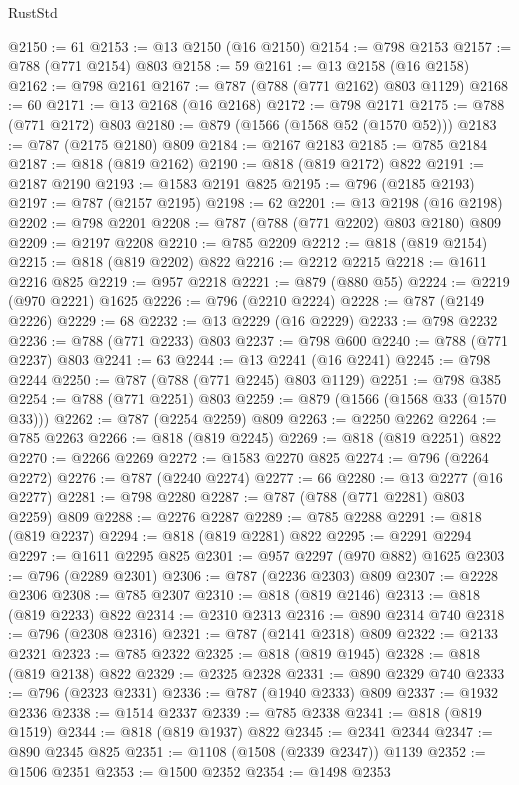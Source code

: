 \begin{lexlean}{RustStd}
\begin{coremodule}
@2150 := 61
@2153 := @13 @2150 (@16 @2150)
@2154 := @798 @2153
@2157 := @788 (@771 @2154) @803
@2158 := 59
@2161 := @13 @2158 (@16 @2158)
@2162 := @798 @2161
@2167 := @787 (@788 (@771 @2162) @803 @1129)
@2168 := 60
@2171 := @13 @2168 (@16 @2168)
@2172 := @798 @2171
@2175 := @788 (@771 @2172) @803
@2180 := @879 (@1566 (@1568 @52 (@1570 @52)))
@2183 := @787 (@2175 @2180) @809
@2184 := @2167 @2183
@2185 := @785 @2184
@2187 := @818 (@819 @2162)
@2190 := @818 (@819 @2172) @822
@2191 := @2187 @2190
@2193 := @1583 @2191 @825
@2195 := @796 (@2185 @2193)
@2197 := @787 (@2157 @2195)
@2198 := 62
@2201 := @13 @2198 (@16 @2198)
@2202 := @798 @2201
@2208 := @787 (@788 (@771 @2202) @803 @2180) @809
@2209 := @2197 @2208
@2210 := @785 @2209
@2212 := @818 (@819 @2154)
@2215 := @818 (@819 @2202) @822
@2216 := @2212 @2215
@2218 := @1611 @2216 @825
@2219 := @957 @2218
@2221 := @879 (@880 @55)
@2224 := @2219 (@970 @2221) @1625
@2226 := @796 (@2210 @2224)
@2228 := @787 (@2149 @2226)
@2229 := 68
@2232 := @13 @2229 (@16 @2229)
@2233 := @798 @2232
@2236 := @788 (@771 @2233) @803
@2237 := @798 @600
@2240 := @788 (@771 @2237) @803
@2241 := 63
@2244 := @13 @2241 (@16 @2241)
@2245 := @798 @2244
@2250 := @787 (@788 (@771 @2245) @803 @1129)
@2251 := @798 @385
@2254 := @788 (@771 @2251) @803
@2259 := @879 (@1566 (@1568 @33 (@1570 @33)))
@2262 := @787 (@2254 @2259) @809
@2263 := @2250 @2262
@2264 := @785 @2263
@2266 := @818 (@819 @2245)
@2269 := @818 (@819 @2251) @822
@2270 := @2266 @2269
@2272 := @1583 @2270 @825
@2274 := @796 (@2264 @2272)
@2276 := @787 (@2240 @2274)
@2277 := 66
@2280 := @13 @2277 (@16 @2277)
@2281 := @798 @2280
@2287 := @787 (@788 (@771 @2281) @803 @2259) @809
@2288 := @2276 @2287
@2289 := @785 @2288
@2291 := @818 (@819 @2237)
@2294 := @818 (@819 @2281) @822
@2295 := @2291 @2294
@2297 := @1611 @2295 @825
@2301 := @957 @2297 (@970 @882) @1625
@2303 := @796 (@2289 @2301)
@2306 := @787 (@2236 @2303) @809
@2307 := @2228 @2306
@2308 := @785 @2307
@2310 := @818 (@819 @2146)
@2313 := @818 (@819 @2233) @822
@2314 := @2310 @2313
@2316 := @890 @2314 @740
@2318 := @796 (@2308 @2316)
@2321 := @787 (@2141 @2318) @809
@2322 := @2133 @2321
@2323 := @785 @2322
@2325 := @818 (@819 @1945)
@2328 := @818 (@819 @2138) @822
@2329 := @2325 @2328
@2331 := @890 @2329 @740
@2333 := @796 (@2323 @2331)
@2336 := @787 (@1940 @2333) @809
@2337 := @1932 @2336
@2338 := @1514 @2337
@2339 := @785 @2338
@2341 := @818 (@819 @1519)
@2344 := @818 (@819 @1937) @822
@2345 := @2341 @2344
@2347 := @890 @2345 @825
@2351 := @1108 (@1508 (@2339 @2347)) @1139
@2352 := @1506 @2351
@2353 := @1500 @2352
@2354 := @1498 @2353

\end{coremodule}
\end{lexlean}
